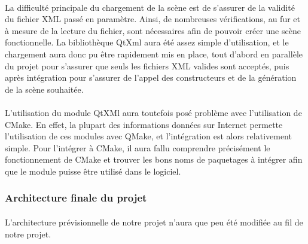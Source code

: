 \paragraph{}
La difficulté principale du chargement de la scène est de s'assurer de la validité du fichier XML passé en paramètre. Ainsi, de nombreuses vérifications, au fur et à mesure de la lecture du fichier, sont nécessaires afin de pouvoir créer une scène fonctionnelle. La bibliothèque QtXml aura été assez simple d'utilisation, et le chargement aura donc pu être rapidement mis en place, tout d'abord en parallèle du projet pour s'assurer que seuls les fichiers XML valides sont acceptés, puis après intégration pour s'assurer de l'appel des constructeurs et de la génération de la scène souhaitée.

\paragraph{}
L'utilisation du module QtXMl aura toutefois posé problème avec l'utilisation de CMake. En effet, la plupart des informations données sur Internet permette l'utilisation de ces modules avec QMake, et l'intégration est alors relativement simple. Pour l'intégrer à CMake, il aura fallu comprendre précisément le fonctionnement de CMake et trouver les bons noms de paquetages à intégrer afin que le module puisse être utilisé dans le logiciel.

\subsubsection{Architecture finale du projet}
\paragraph{}
L'architecture prévisionnelle de notre projet n'aura que peu été modifiée au fil de notre projet.

